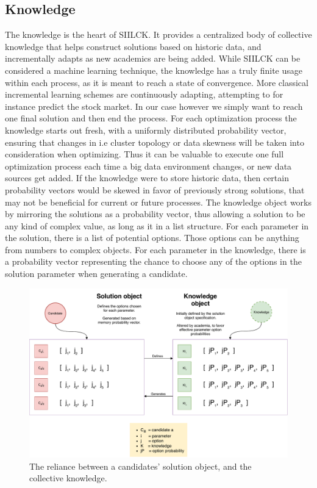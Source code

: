 \documentclass[a4paper,english]{report}
\begin{document}
		\subsection{Knowledge}
		\label{knowledge}
		The knowledge is the heart of SIILCK. It provides a centralized body of collective knowledge that helps construct solutions based on historic data, and incrementally adapts as new academics are being added. While SIILCK can be considered a machine learning technique, the knowledge has a truly finite usage within each process, as it is meant to reach a state of convergence. More classical incremental learning schemes are continuously adapting, attempting to for instance predict the stock market. In our case however we simply want to reach one final solution and then end the process. For each optimization process the knowledge starts out fresh, with a uniformly distributed probability vector, ensuring that changes in i.e cluster topology or data skewness will be taken into consideration when optimizing. Thus it can be valuable to execute one full optimization process each time a big data environment changes, or new data sources get added. If the knowledge were to store historic data, then certain probability vectors would be skewed in favor of previously strong solutions, that may not be beneficial for current or future processes. The knowledge object works by mirroring the solutions as a probability vector, thus allowing a solution to be any kind of complex value, as long as it in a list structure. For each parameter in the solution, there is a list of potential options. Those options can be anything from numbers to complex objects. For each parameter in the knowledge, there is a probability vector representing the chance to choose any of the options in the solution parameter when generating a candidate.
		\begin{figure}[H]
			\includegraphics[width=\textwidth]{memory_candidate}
			\caption{The reliance between a candidates' solution object, and the collective knowledge.}
		\end{figure}
		\clearpage
\end{document}
